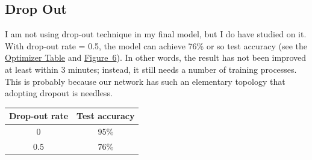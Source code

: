 \documentclass{article}
\begin{document}
\subsection{Drop Out}
I am not using drop-out technique in my final model, but I do have studied on it. With drop-out rate = 0.5, the model can achieve 76\% or so test accuracy (see the \hyperref[tab-5]{Optimizer Table} and \hyperref[fig-6]{Figure~6}). In other words, the result has not been improved at least within 3 minutes; instead, it still needs a number of training processes. This is probably because our network has such an elementary topology that adopting dropout is needless.

\begin{center}
	\label{tab-5}
	\begin{tabular}{cc}
		\toprule
		Drop-out rate & Test accuracy \\
		\midrule
		0 & 95\% \\
		0.5 & 76\% \\
		\bottomrule
	\end{tabular}
\end{center}
\end{document}
